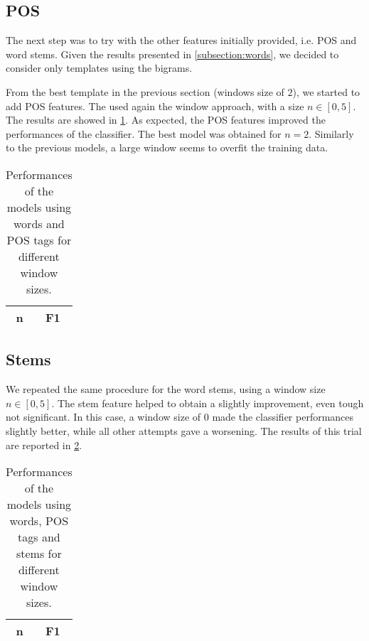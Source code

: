 \subsection{POS}
\label{subsection:pos}
The next step was to try with the other features initially provided, i.e. \ac{POS} and word stems.
Given the results presented in \cref{subsection:words}, we decided to consider only templates using the bigrams.

From the best template in the previous section (windows size of $2$), we started to add \ac{POS} features.
The used again the window approach, with a size $n \in [0,5]$.
The results are showed in \cref{tab:pos}.
As expected, the \ac{POS} features improved the performances of the classifier.
The best model was obtained for $n = 2$.
Similarly to the previous models, a large window seems to overfit the training data.

\begin{table}[h]
	\centering
    \begin{tabular}{ c c }
    	\toprule
    		\multicolumn{1}{c}{n} & \multicolumn{1}{c}{F1} \\
    	\midrule
            
    	\bottomrule
	\end{tabular}
    \caption{Performances of the models using words and POS tags for different window sizes.}
	\label{tab:pos}
\end{table}

\subsection{Stems}
\label{subsection:stems}
We repeated the same procedure for the word stems, using a window size $n \in [0,5]$.
The stem feature helped to obtain a slightly improvement, even tough not significant.
In this case, a window size of $0$ made the classifier performances slightly better, while all other attempts gave a worsening.
The results of this trial are reported in \cref{tab:stems}.

\begin{table}[h]
	\centering
    \begin{tabular}{ c c }
    	\toprule
    		\multicolumn{1}{c}{n} & \multicolumn{1}{c}{F1} \\
    	\midrule
            
    	\bottomrule
	\end{tabular}
    \caption{Performances of the models using words, POS tags and stems for different window sizes.}
	\label{tab:stems}
\end{table}

